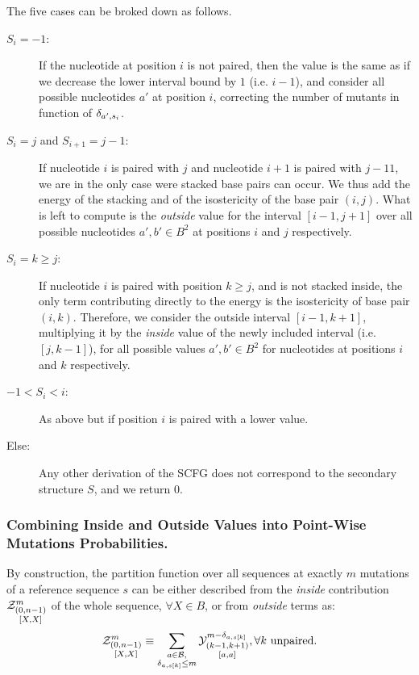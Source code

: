 The five cases can be broked down as follows.
\begin{description}
\item[$S_i=-1$:] If the nucleotide at position $i$ is not paired, then the value is the same
as if we decrease the lower interval bound by $1$ (i.e. $i-1$), and consider all possible
nucleotides $a'$ at position $i$, correcting the number of mutants
in function of $\delta_{a',s_i}$.
\item[$S_{i}=j$ and $S_{i+1}=j-1$:] If nucleotide $i$ is paired with $j$ and nucleotide $i+1$ is
paired with $j-11$, we are in the only case were stacked base pairs can occur. We thus add
the energy of the stacking and of the isostericity of the base pair $(i,j)$. What is left
to compute is the \emph{outside} value for the interval $[i-1,j+1]$ over all possible nucleotides 
$a',b'\in B^2$ at positions $i$ and $j$ respectively.
\item[$S_{i}=k \geq j$:]If nucleotide $i$ is paired with position $k\geq j$, 
and is not stacked inside, the 
only term contributing directly to the energy is the isostericity of base pair $(i,k)$. 
Therefore, we consider the outside interval $[i-1,k+1]$, multiplying it by the \emph{inside}
value of the newly included interval (i.e. $[j,k-1]$), for 
all possible values $a',b'\in B^2$ for nucleotides at positions $i$ and $k$ respectively.
\item[$-1<S_{i}<i$:]As above but if position $i$ is paired with a lower value.
\item[Else:] Any other derivation of the SCFG does not correspond to the 
secondary structure $S$, and we return $0$.


\end{description}

\subsubsection{Combining Inside and Outside Values into Point-Wise Mutations Probabilities.}
By construction, the partition function over all sequences at exactly $m$ mutations of a reference sequence $s$ can 
be either described from the \emph{inside} contribution $\Z{0,n-1}{m}{X,X}$ of the whole sequence,
$\forall X\in B$, or from \emph{outside} terms as:
$$
	\Z{0,n-1}{m}{X,X}
	\equiv
	\sum_{\substack{a\in \B,\\ \Kron_{a,s[k]}\le m}}	
	\Y{k-1,k+1}{m-\Kron_{a,s[k]}}{a,a},\forall k \text{	unpaired.}
$$


